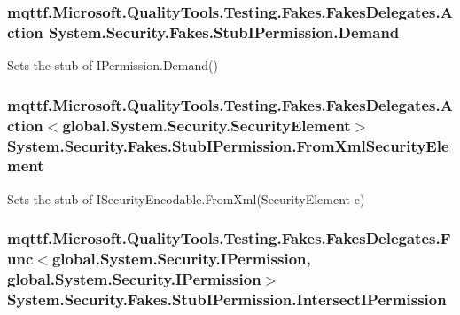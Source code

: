 \hypertarget{class_system_1_1_security_1_1_fakes_1_1_stub_i_permission_a48f9f315bca8285098ad707b782ed64d}{
\subsubsection[{Demand}]{\setlength{\rightskip}{0pt plus 5cm}mqttf.\-Microsoft.\-Quality\-Tools.\-Testing.\-Fakes.\-Fakes\-Delegates.\-Action System.\-Security.\-Fakes.\-Stub\-I\-Permission.\-Demand}}\label{class_system_1_1_security_1_1_fakes_1_1_stub_i_permission_a48f9f315bca8285098ad707b782ed64d}


Sets the stub of I\-Permission.\-Demand()

\hypertarget{class_system_1_1_security_1_1_fakes_1_1_stub_i_permission_a129835596b70a0090eb8933fd4ebcd14}{
\subsubsection[{From\-Xml\-Security\-Element}]{\setlength{\rightskip}{0pt plus 5cm}mqttf.\-Microsoft.\-Quality\-Tools.\-Testing.\-Fakes.\-Fakes\-Delegates.\-Action$<$global.\-System.\-Security.\-Security\-Element$>$ System.\-Security.\-Fakes.\-Stub\-I\-Permission.\-From\-Xml\-Security\-Element}}\label{class_system_1_1_security_1_1_fakes_1_1_stub_i_permission_a129835596b70a0090eb8933fd4ebcd14}


Sets the stub of I\-Security\-Encodable.\-From\-Xml(\-Security\-Element e)

\hypertarget{class_system_1_1_security_1_1_fakes_1_1_stub_i_permission_a1bdfb225517f22278e4fd70df138e967}{
\subsubsection[{Intersect\-I\-Permission}]{\setlength{\rightskip}{0pt plus 5cm}mqttf.\-Microsoft.\-Quality\-Tools.\-Testing.\-Fakes.\-Fakes\-Delegates.\-Func$<$global.\-System.\-Security.\-I\-Permission, global.\-System.\-Security.\-I\-Permission$>$ System.\-Security.\-Fakes.\-Stub\-I\-Permission.\-Intersect\-I\-Permission}}\label{class_system_1_1_security_1_1_fakes_1_1_stub_i_permission_a1bdfb225517f22278e4fd70df138e967}


